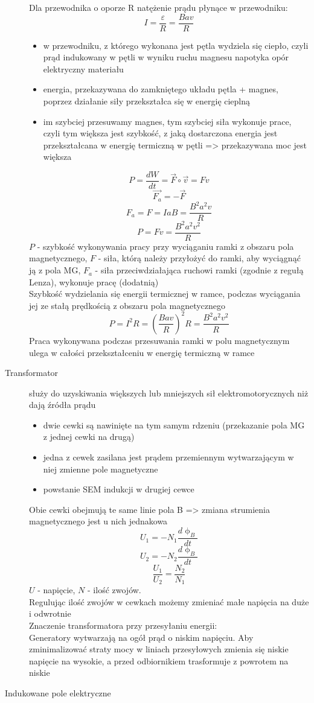\documentclass[a4paper,11pt]{article}
\begin{document}
\begin{description}
  Dla przewodnika o oporze R natężenie prądu płynące w przewodniku:
  $$I=\frac{\varepsilon}{R}=\frac{Bav}{R}$$
  \begin{itemize}
  \item w przewodniku, z którego wykonana jest pętla wydziela się ciepło, czyli prąd indukowany w pętli w wyniku ruchu magnesu napotyka opór elektryczny materiału
  \item energia, przekazywana do zamkniętego układu pętla + magnes, poprzez działanie siły przekształca się w energię cieplną
  \item im szybciej przesuwamy magnes, tym szybciej siła wykonuje prace, czyli tym większa jest szybkość, z jaką dostarczona energia jest przekształcana w energię termiczną w pętli => przekazywana moc jest większa
  \end{itemize}
  $$P = \frac{dW}{dt} = \vec{F}\circ \vec{v} = Fv$$
  $$\vec{F_a} = - \vec{F}$$
  $$F_a = F = IaB = \frac{B^2a^2v}{R}$$
  $$P=Fv=\frac{B^2a^2v^2}{R}$$
  $P$ - szybkość wykonywania pracy przy wyciąganiu ramki z obszaru pola magnetycznego, $F$ - siła, którą należy przyłożyć do ramki, aby wyciągnąć ją z pola MG, $F_a$ - siła przeciwdziałająca ruchowi ramki (zgodnie z regułą Lenza), wykonuje pracę (dodatnią)\\
  Szybkość wydzielania się energii termicznej w ramce, podczas wyciągania jej ze stałą prędkością z obszaru pola magnetycznego
  $$P=I^2R = \left(\frac{Bav}{R}\right)^2R = \frac{B^2a^2v^2}{R}$$
  Praca wykonywana podczas przesuwania ramki w polu magnetycznym ulega w całości przekształceniu w energię termiczną w ramce
\item[Transformator] służy do uzyskiwania większych lub mniejszych sił elektromotorycznych niż dają źródła prądu
  \begin{itemize}
  \item dwie cewki są nawinięte na tym samym rdzeniu (przekazanie pola MG z jednej cewki na drugą)
  \item jedna z cewek zasilana jest prądem przemiennym wytwarzającym w niej zmienne pole magnetyczne
  \item powstanie SEM indukcji w drugiej cewce
  \end{itemize}
  Obie cewki obejmują te same linie pola B => zmiana strumienia magnetycznego jest u nich jednakowa
  $$U_1 = -N_1\frac{d\upphi_B}{dt}$$
  $$U_2 = -N_2\frac{d\upphi_B}{dt}$$
  $$\frac{U_1}{U_2} = \frac{N_2}{N_1}$$
  $U$ - napięcie, $N$ - ilość zwojów.\\
  Regulując ilość zwojów w cewkach możemy zmieniać małe napięcia na duże i odwrotnie\\
  Znaczenie transformatora przy przesyłaniu energii:\\
  Generatory wytwarzają na ogół prąd o niskim napięciu. Aby zminimalizować straty mocy w liniach przesyłowych zmienia się niskie napięcie na wysokie, a przed odbiornikiem trasformuje z powrotem na niskie
\item[Indukowane pole elektryczne]


\end{description}
\end{document}
